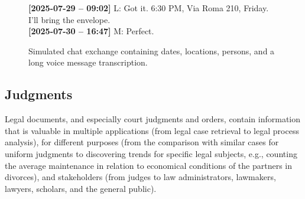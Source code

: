 \begin{figure}[htbp]
\begin{minipage}{0.92\linewidth}
\textbf{[2025-07-29 -- 09:02]} L: Got it. 6:30 PM, Via Roma 210, Friday. I'll bring the envelope.\\
\textbf{[2025-07-30 -- 16:47]} M: Perfect.
\end{minipage}
\caption{Simulated chat exchange containing dates, locations, persons, and a long voice message transcription.}
\label{fig:chat-investigation-example}
\end{figure}


\subsection{Judgments}
Legal documents, and especially court judgments and orders, contain information that is valuable in multiple applications (from legal case retrieval to legal process analysis), for different purposes (from the comparison with similar cases for uniform judgments to discovering trends for specific legal subjects, e.g., counting the average maintenance in relation to economical conditions of the partners in divorces), and stakeholders (from judges to law administrators, lawmakers, lawyers, scholars, and the general public).

